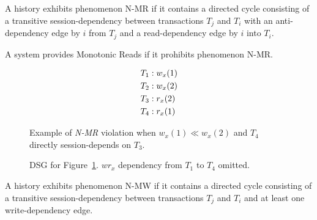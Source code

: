 \begin{definition}
A history exhibits phenomenon N-MR if it contains a directed cycle
consisting of a transitive session-dependency between transactions
$T_j$ and $T_i$ with an anti-dependency edge by $i$ from $T_j$ and a
read-dependency edge by $i$ into $T_i$.
\end{definition}

\begin{definition}
A system provides Monotonic Reads if it prohibits phenomenon N-MR.
\end{definition}


\begin{figure}[H]
\begin{align*}
\small
T_1 &: w_x(1)\\
T_2 &: w_x(2)\\
T_3 &: r_x(2)\\
T_4 &: r_x(1)
\end{align*}
\caption{Example of \textit{N-MR} violation when $w_x(1) \ll w_x(2)$ and $T_4$ directly session-depends on $T_3$.}
\label{fig:nmr-history}
\end{figure}

\begin{figure}[H]
\centering
{}
\caption{DSG for Figure~\ref{fig:nmr-history}. $wr_x$ dependency from $T_1$ to $T_4$ omitted.} 
\label{fig:nmr-dsg}
\end{figure}

\begin{definition}
A history exhibits phenomenon N-MW if it contains a directed cycle
consisting of a transitive session-dependency between transactions
$T_j$ and $T_i$ and at least one write-dependency edge.
\end{definition}


